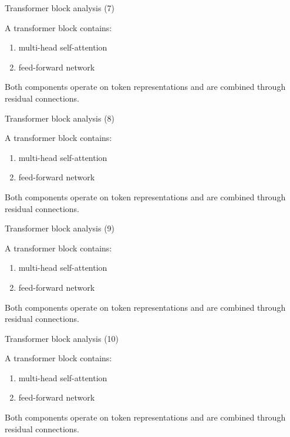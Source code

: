 \documentclass[aspectratio=169]{beamer}
\begin{document}
\begin{frame}{Transformer block analysis (7)}

A transformer block contains:

\begin{enumerate}
\item multi-head self-attention
\item feed-forward network
\end{enumerate}

Both components operate on token representations and are
combined through residual connections.

\end{frame}


\begin{frame}{Transformer block analysis (8)}

A transformer block contains:

\begin{enumerate}
\item multi-head self-attention
\item feed-forward network
\end{enumerate}

Both components operate on token representations and are
combined through residual connections.

\end{frame}


\begin{frame}{Transformer block analysis (9)}

A transformer block contains:

\begin{enumerate}
\item multi-head self-attention
\item feed-forward network
\end{enumerate}

Both components operate on token representations and are
combined through residual connections.

\end{frame}


\begin{frame}{Transformer block analysis (10)}

A transformer block contains:

\begin{enumerate}
\item multi-head self-attention
\item feed-forward network
\end{enumerate}

Both components operate on token representations and are
combined through residual connections.

\end{frame}
\end{document}
